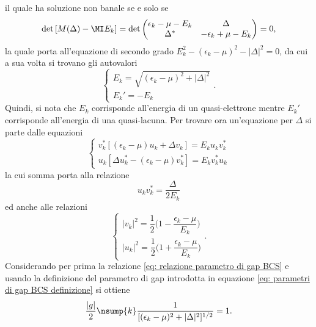 il quale ha soluzione non banale se e solo se 
\begin{equation}
    \det{[M(\Delta) - \MI E_k]} = \det
    \begin{pmatrix}
        \epsilon_k - \mu - E_k & \Delta \\
        \Delta^* & -\epsilon_k + \mu - E_k
    \end{pmatrix} = 0,
\end{equation}
la quale porta all'equazione di secondo grado $E_k^2 - (\epsilon_k - \mu)^2 - |\Delta|^2 = 0$, da cui a sua volta si trovano gli autovalori 
\begin{equation}
    \begin{cases}
        E_k = \sqrt{(\epsilon_k - \mu)^2 + |\Delta|^2} \\
        E_k' = -E_k
    \end{cases}.
\end{equation}
Quindi, si nota che $E_k$ corrisponde all'energia di un quasi-elettrone mentre $E_k'$ corrisponde all'energia di una quasi-lacuna. Per trovare ora un'equazione per $\Delta$ si parte dalle equazioni
\begin{equation}
    \begin{cases}
        v_k^*[(\epsilon_k - \mu)u_k + \Delta v_k] = E_ku_kv_k^* \\
        u_k[\Delta u_k^* - (\epsilon_k - \mu)v_k^*] = E_kv_k^*u_k
    \end{cases}
\end{equation}
la cui somma porta alla relazione
\begin{equation}
\label{eq: relazione parametro di gap BCS}
    u_kv_k^* = \frac{\Delta}{2E_k}
\end{equation}
ed anche alle relazioni
\begin{equation}
    \begin{cases}
        |v_k|^2 = \dfrac{1}{2}\bigg(1 - \dfrac{\epsilon_k - \mu}{E_k}\bigg) \\[2ex]
        |u_k|^2 = \dfrac{1}{2}\bigg(1 + \dfrac{\epsilon_k - \mu}{E_k}\bigg)
    \end{cases}.
\end{equation}
Considerando per prima la relazione \eqref{eq: relazione parametro di gap BCS} e usando la definizione del parametro di gap introdotta in equazione \eqref{eq: parametri di gap BCS definizione} si ottiene
\begin{equation}
    \frac{|g|}{2}\nsump{k}\frac{1}{[(\epsilon_k - \mu)^2 + |\Delta|^2]^{1/2}} = 1.
\end{equation}
